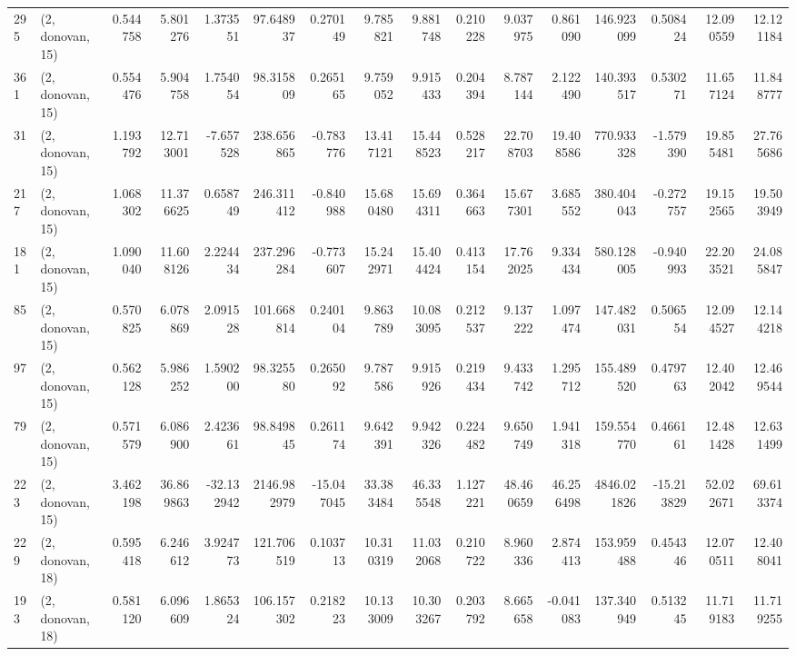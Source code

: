 \begin{tabular}{llrrrrrrrrrrrrrr}
295 &  (2, donovan, 15) &   0.544758 &   5.801276 &   1.373551 &    97.648937 &   0.270149 &   9.785821 &   9.881748 &  0.210228 &   9.037975 &   0.861090 &    146.923099 &    0.508424 &   12.090559 &   12.121184 \\
361 &  (2, donovan, 15) &   0.554476 &   5.904758 &   1.754054 &    98.315809 &   0.265165 &   9.759052 &   9.915433 &  0.204394 &   8.787144 &   2.122490 &    140.393517 &    0.530271 &   11.657124 &   11.848777 \\
31  &  (2, donovan, 15) &   1.193792 &  12.713001 &  -7.657528 &   238.656865 &  -0.783776 &  13.417121 &  15.448523 &  0.528217 &  22.708703 &  19.408586 &    770.933328 &   -1.579390 &   19.855481 &   27.765686 \\
217 &  (2, donovan, 15) &   1.068302 &  11.376625 &   0.658749 &   246.311412 &  -0.840988 &  15.680480 &  15.694311 &  0.364663 &  15.677301 &   3.685552 &    380.404043 &   -0.272757 &   19.152565 &   19.503949 \\
181 &  (2, donovan, 15) &   1.090040 &  11.608126 &   2.224434 &   237.296284 &  -0.773607 &  15.242971 &  15.404424 &  0.413154 &  17.762025 &   9.334434 &    580.128005 &   -0.940993 &   22.203521 &   24.085847 \\
85  &  (2, donovan, 15) &   0.570825 &   6.078869 &   2.091528 &   101.668814 &   0.240104 &   9.863789 &  10.083095 &  0.212537 &   9.137222 &   1.097474 &    147.482031 &    0.506554 &   12.094527 &   12.144218 \\
97  &  (2, donovan, 15) &   0.562128 &   5.986252 &   1.590200 &    98.325580 &   0.265092 &   9.787586 &   9.915926 &  0.219434 &   9.433742 &   1.295712 &    155.489520 &    0.479763 &   12.402042 &   12.469544 \\
79  &  (2, donovan, 15) &   0.571579 &   6.086900 &   2.423661 &    98.849845 &   0.261174 &   9.642391 &   9.942326 &  0.224482 &   9.650749 &   1.941318 &    159.554770 &    0.466161 &   12.481428 &   12.631499 \\
223 &  (2, donovan, 15) &   3.462198 &  36.869863 & -32.132942 &  2146.982979 & -15.047045 &  33.383484 &  46.335548 &  1.127221 &  48.460659 &  46.256498 &   4846.021826 &  -15.213829 &   52.022671 &   69.613374 \\
229 &  (2, donovan, 18) &   0.595418 &   6.246612 &   3.924773 &   121.706519 &   0.103713 &  10.310319 &  11.032068 &  0.210722 &   8.960336 &   2.874413 &    153.959488 &    0.454346 &   12.070511 &   12.408041 \\
193 &  (2, donovan, 18) &   0.581120 &   6.096609 &   1.865324 &   106.157302 &   0.218223 &  10.133009 &  10.303267 &  0.203792 &   8.665658 &  -0.041083 &    137.340949 &    0.513245 &   11.719183 &   11.719255 \\

\end{tabular}
